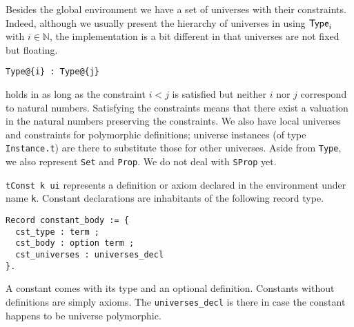 
Besides the global environment we have a set of universes with their
constraints. Indeed, although we usually present the hierarchy of universes in
\Coq using \(\mathsf{Type}_i\) with \(i \in \mathbb{N}\), the implementation is a bit
different in that universes are not fixed but floating.
\begin{verbatim}
Type@{i} : Type@{j}
\end{verbatim}
holds in \Coq as long as the constraint \(i < j\) is satisfied but neither \(i\)
nor \(j\) correspond to natural numbers. Satisfying the constraints means that
there exist a valuation in the natural numbers preserving the constraints.
We also have local universes and constraints for polymorphic definitions;
universe instances (of type \texttt{Instance.t}) are there to
substitute those for other universes.
Aside from \texttt{Type}, we also represent \texttt{Set}
and \texttt{Prop}. We do not deal with \texttt{SProp} yet.


\texttt{tConst k ui} represents a definition or axiom declared in the
environment under name \texttt{k}. Constant declarations are
inhabitants of the following record type.
\begin{verbatim}
Record constant_body := {
  cst_type : term ;
  cst_body : option term ;
  cst_universes : universes_decl
}.
\end{verbatim}
A constant comes with its type and an optional definition. Constants without
definitions are simply axioms.
The \texttt{universes_decl} is there in case the constant happens to
be universe polymorphic.


